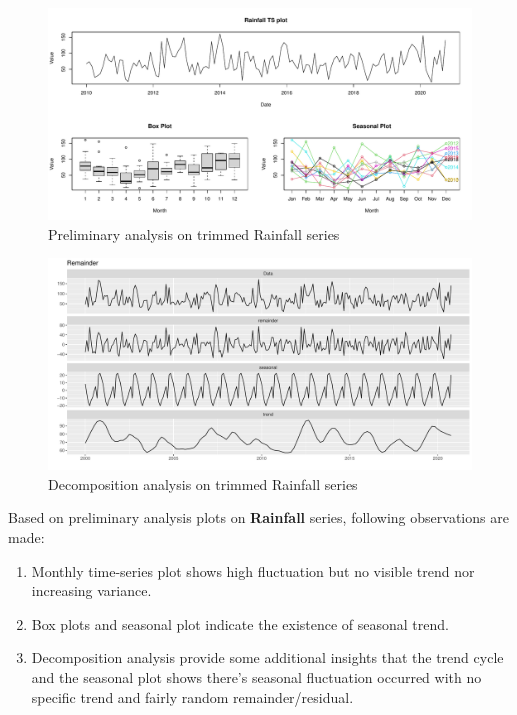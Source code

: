 \documentclass[
  11pt,
]{article}
\providecommand{\tightlist}{%
  \setlength{\itemsep}{0pt}\setlength{\parskip}{0pt}}
\begin{document}
\newpage

\begin{figure}
\centering
\includegraphics{ST422_files/figure-latex/unnamed-chunk-20-1.pdf}
\caption{Preliminary analysis on trimmed Rainfall series}
\end{figure}

\begin{figure}
\centering
\includegraphics{ST422_files/figure-latex/unnamed-chunk-21-1.pdf}
\caption{Decomposition analysis on trimmed Rainfall series}
\end{figure}

Based on preliminary analysis plots on \textbf{Rainfall} series,
following observations are made:

\begin{enumerate}
\def\labelenumi{\arabic{enumi}.}
\tightlist
\item
  Monthly time-series plot shows high fluctuation but no visible trend
  nor increasing variance.
\item
  Box plots and seasonal plot indicate the existence of seasonal trend.
\item
  Decomposition analysis provide some additional insights that the trend
  cycle and the seasonal plot shows there's seasonal fluctuation
  occurred with no specific trend and fairly random remainder/residual.
\end{enumerate}
\end{document}
